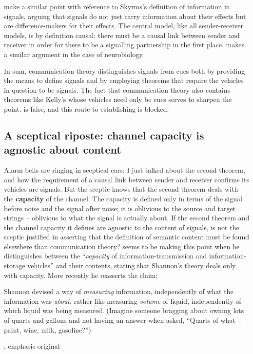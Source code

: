 \documentclass[12pt]{article}
\begin{document}
\citet{calcott2020signals} make a similar point with reference to Skyrms's \citeyearpar{skyrms2010signals} definition of information in signals, arguing that signals do not just carry information about their effects but are difference-makers for their effects.
The central model, like all sender-receiver models, is by definition causal: there must be a causal link between sender and receiver in order for there to be a signalling partnership in the first place.
\citet{rathkopf2017neural} makes a similar argument in the case of neurobiology.

In sum, communication theory distinguishes signals from cues both by providing the means to define signals and by employing theorems that require the vehicles in question to be signals.
The fact that communication theory also contains theorems like Kelly's whose vehicles need only be cues serves to sharpen the point.
\act{} is false, and this route to establishing \tic{} is blocked.

\subsection{A sceptical riposte: channel capacity is agnostic about content}

Alarm bells are ringing in sceptical ears: I just talked about the second theorem, and how the requirement of a causal link between sender and receiver confirms its vehicles are signals.
But the sceptic knows that the second theorem deals with the \textbf{capacity} of the channel.
The capacity is defined only in terms of the signal before noise and the signal after noise; it is oblivious to the source and target strings -- oblivious to what the signal is actually about.
If the second theorem and the channel capacity it defines are agnostic to the content of signals, is not the sceptic justified in asserting that the definition of semantic content must be found elsewhere than communication theory?
\citet[344]{dennett1983intentional} seems to be making this point when he distinguishes between the ``\textit{capacity} of information-transmission and information-storage vehicles'' and their contents, stating that Shannon's theory deals only with capacity.
More recently he reasserts the claim:

\begin{myquote}
Shannon devised a way of \textit{measuring} information, independently of what the information was \textit{about}, rather like measuring \textit{volume} of liquid, independently of which liquid was being measured. (Imagine someone bragging about owning lots of quarts and gallons and not having an answer when asked, ``Quarts of what -- paint, wine, milk, gasoline?'')
\par\hspace*{\fill}\citet[106]{dennett2017bacteria}, emphasis original
\end{myquote}
\end{document}
